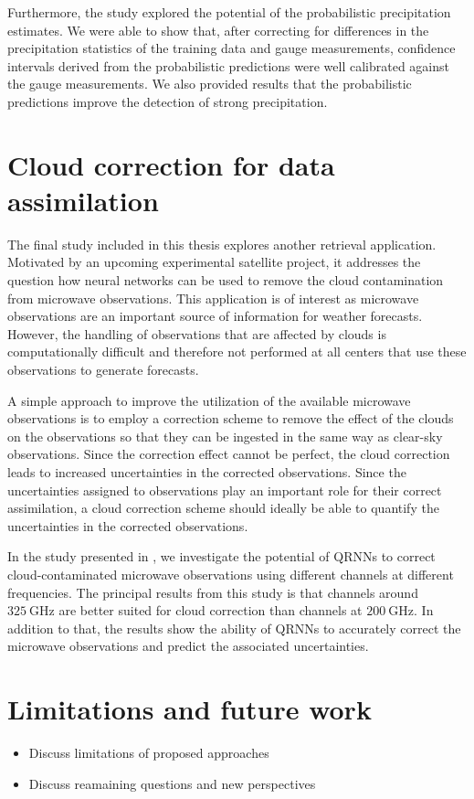 Furthermore, the study explored the potential of the probabilistic precipitation
estimates. We were able to show that, after correcting for differences in the
precipitation statistics of the training data and gauge measurements, confidence
intervals derived from the probabilistic predictions were well calibrated
against the gauge measurements. We also provided results that the probabilistic
predictions improve the detection of strong precipitation.


\section{Cloud correction for data assimilation}

The final study included in this thesis explores another retrieval application.
Motivated by an upcoming experimental satellite project, it addresses the
question how neural networks can be used to remove the cloud contamination from
microwave observations. This application is of interest as microwave
observations are an important source of information for weather forecasts.
However, the handling of observations that are affected by clouds is
computationally difficult and therefore not performed at all centers that use
these observations to generate forecasts.

A simple approach to improve the utilization of the available microwave
observations is to employ a correction scheme to remove the effect of the
clouds on the observations so that they can be ingested in the same way as
clear-sky observations. Since the correction effect cannot be
perfect, the cloud correction leads to increased uncertainties in the
corrected observations. Since the uncertainties assigned to observations play
an important role for their correct assimilation, a cloud correction scheme
should ideally be able to quantify the uncertainties in the corrected
observations.

In the study presented in \citet{kaur20}, we investigate the potential of QRNNs
to correct cloud-contaminated microwave observations using different channels at
different frequencies. The principal results from this study is that channels
around $\SI{325}{\giga \hertz}$ are better suited for cloud correction than
channels at $\SI{200}{\giga \hertz}$. In addition to that, the results show the
ability of QRNNs to accurately correct the microwave observations and predict
the associated uncertainties.




\section{Limitations and future work}
\begin{itemize}
  \item Discuss limitations of proposed approaches
  \item Discuss reamaining questions and new perspectives
\end{itemize}

